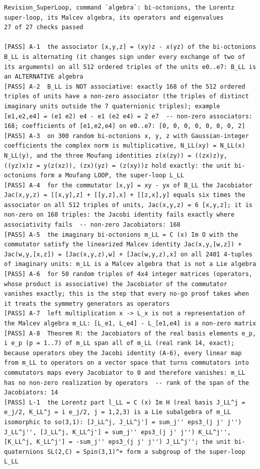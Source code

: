 \documentclass[
  10pt,
]{article}
\begin{document}
\begin{verbatim}
Revision_SuperLoop, command `algebra`: bi-octonions, the Lorentz super-loop, its Malcev algebra, its operators and eigenvalues
27 of 27 checks passed

[PASS] A-1  the associator [x,y,z] = (xy)z - x(yz) of the bi-octonions B_LL is alternating (it changes sign under every exchange of two of its arguments) on all 512 ordered triples of the units e0..e7: B_LL is an ALTERNATIVE algebra
[PASS] A-2  B_LL is NOT associative: exactly 168 of the 512 ordered triples of units have a non-zero associator (the triples of distinct imaginary units outside the 7 quaternionic triples); example [e1,e2,e4] = (e1 e2) e4 - e1 (e2 e4) = 2 e7  -- non-zero associators: 168; coefficients of [e1,e2,e4] on e0..e7: [0, 0, 0, 0, 0, 0, 0, 2]
[PASS] A-3  on 300 random bi-octonions x, y, z with Gaussian-integer coefficients the complex norm is multiplicative, N_LL(xy) = N_LL(x) N_LL(y), and the three Moufang identities z(x(zy)) = ((zx)z)y, ((yz)x)z = y(z(xz)), (zx)(yz) = (z(xy))z hold exactly: the unit bi-octonions form a Moufang LOOP, the super-loop L_LL
[PASS] A-4  for the commutator [x,y] = xy - yx of B_LL the Jacobiator Jac(x,y,z) = [[x,y],z] + [[y,z],x] + [[z,x],y] equals six times the associator on all 512 triples of units, Jac(x,y,z) = 6 [x,y,z]; it is non-zero on 168 triples: the Jacobi identity fails exactly where associativity fails  -- non-zero Jacobiators: 168
[PASS] A-5  the imaginary bi-octonions m_LL = C (x) Im O with the commutator satisfy the linearized Malcev identity Jac(x,y,[w,z]) + Jac(w,y,[x,z]) = [Jac(x,y,z),w] + [Jac(w,y,z),x] on all 2401 4-tuples of imaginary units: m_LL is a Malcev algebra that is not a Lie algebra
[PASS] A-6  for 50 random triples of 4x4 integer matrices (operators, whose product is associative) the Jacobiator of the commutator vanishes exactly; this is the step that every no-go proof takes when it treats the symmetry generators as operators
[PASS] A-7  left multiplication x -> L_x is not a representation of the Malcev algebra m_LL: [L_e1, L_e4] - L_[e1,e4] is a non-zero matrix
[PASS] A-8  Theorem R: the Jacobiators of the real basis elements e_p, i e_p (p = 1..7) of m_LL span all of m_LL (real rank 14, exact); because operators obey the Jacobi identity (A-6), every linear map from m_LL to operators on a vector space that turns commutators into commutators maps every Jacobiator to 0 and therefore vanishes: m_LL has no non-zero realization by operators  -- rank of the span of the Jacobiators: 14
[PASS] L-1  the Lorentz part l_LL = C (x) Im H (real basis J_LL^j = e_j/2, K_LL^j = i e_j/2, j = 1,2,3) is a Lie subalgebra of m_LL isomorphic to so(3,1): [J_LL^j, J_LL^j'] = sum_j'' eps3_(j j' j'') J_LL^j'', [J_LL^j, K_LL^j'] = sum_j'' eps3_(j j' j'') K_LL^j'', [K_LL^j, K_LL^j'] = -sum_j'' eps3_(j j' j'') J_LL^j''; the unit bi-quaternions SL(2,C) = Spin(3,1)^+ form a subgroup of the super-loop L_LL

\end{verbatim}
\end{document}
